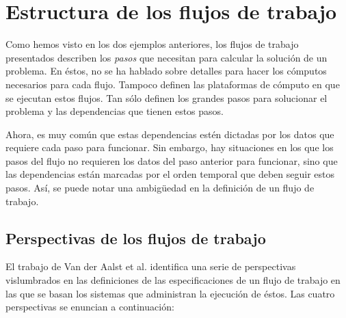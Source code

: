 \documentclass[letterpaper, 12pt]{report}
\begin{document}
\section{Estructura de los flujos de trabajo}
Como hemos visto en los dos ejemplos anteriores, los flujos de trabajo presentados describen los \emph{pasos} que necesitan para calcular la solución de un problema. En éstos, no se ha hablado sobre detalles para hacer los cómputos necesarios para cada flujo. Tampoco definen las plataformas de cómputo en que se ejecutan estos flujos. Tan sólo definen los grandes pasos para solucionar el problema y las dependencias que tienen estos pasos. 

Ahora, es muy común que estas dependencias estén dictadas por los datos que requiere cada paso para funcionar. Sin embargo, hay situaciones en los que los pasos del flujo no requieren los datos del paso anterior para funcionar, sino que las dependencias están marcadas por el orden temporal que deben seguir estos pasos. Así, se puede notar una ambigüedad en la definición de un flujo de trabajo.

\subsection{Perspectivas de los flujos de trabajo}
El trabajo de Van der Aalst et al. \cite{van2003workflow} identifica una serie de perspectivas vislumbrados en las definiciones de las especificaciones de un flujo de trabajo en las que se basan los sistemas que administran la ejecución de éstos. Las cuatro perspectivas se enuncian a continuación:
\end{document}
